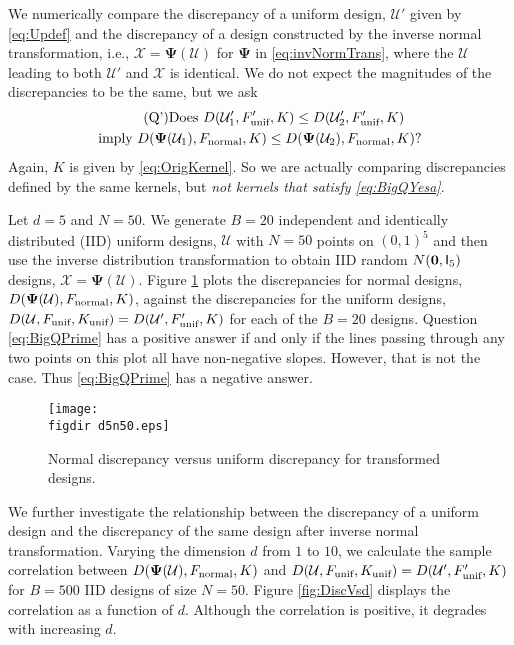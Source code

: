 \documentclass[graybox]{svmult}
\newcommand{\vPsi}{\boldsymbol{\Psi}}
\newcommand{\Udes}{\mathcal{U}}
\newcommand{\Xdes}{\mathcal{X}}
\newcommand{\unif}{\textup{unif}}
\newcommand{\normal}{\textup{normal}}
\newcommand{\figdir}{code/} %
\begin{document}
We numerically compare the discrepancy of a uniform design, $\Udes'$ given by \eqref{eq:Updef} and the discrepancy of a design constructed by the inverse normal transformation, i.e.,  $\Xdes = \vPsi(\Udes)$ for $\vPsi$ in \eqref{eq:invNormTrans}, where the $\Udes$ leading to both $\Udes'$ and $\Xdes$ is identical.  We do not expect the magnitudes of the discrepancies to be the same, but we ask
\begin{multline} \tag{Q'} \label{eq:BigQPrime}
    \text{Does } D(\Udes'_1,F'_\unif, K)\leq D(\Udes_2',F_\unif', K) \\
    \text{imply }
     D(\vPsi(\Udes_1),F_\normal, K)\leq D(\vPsi(\Udes_2),F_\normal, K)?
\end{multline}
Again, $K$ is given by \eqref{eq:OrigKernel}.  So we are actually comparing discrepancies defined by the same kernels, but \emph{not kernels that satisfy \eqref{eq:BigQYesa}}.

Let $d=5$ and $N=50$. 
We generate $B=20$ independent and identically distributed (IID) uniform designs, $\Udes$ with $N=50$ points on $(0,1)^5$ and then use the inverse distribution transformation to obtain IID random $N({\bf 0}, {\mathsf I}_5)$ designs, $\Xdes = \vPsi(\Udes)$. 
Figure \ref{fig:UniVsNormDisc} plots the discrepancies for normal designs, $D(\vPsi(\Udes),F_\normal, K)$,  against the discrepancies for the uniform designs, $D(\Udes,F_\unif,K_\unif) = D(\Udes',F_\unif',K)$ for each of the $B=20$ designs. 
Question \eqref{eq:BigQPrime} has a positive answer if and only if the lines passing through any two points on this plot all have non-negative slopes.  However, that is not the case.  Thus \eqref{eq:BigQPrime} has a negative answer.

\begin{figure}[ht]
\begin{center}
\texttt{[image: \\figdir d5n50.eps]}
\caption{Normal discrepancy versus uniform discrepancy for transformed designs. \label{fig:UniVsNormDisc}}
\end{center}
\end{figure}

We further investigate the relationship between the discrepancy of a uniform design and the discrepancy of the same design after inverse normal transformation.
Varying the dimension $d$ from $1$ to $10$, we calculate the sample correlation between $D(\vPsi(\Udes),F_\normal, K)$ and $D(\Udes,F_\unif,K_\unif) = D(\Udes',F_\unif',K)$ for $B=500$ IID designs of size $N=50$.  Figure \ref{fig:DiscVsd} displays the correlation as a function of $d$. Although the correlation is positive, it degrades with increasing $d$.
\end{document}
